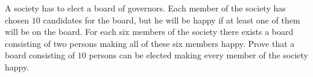 A society has to elect a board of governors. Each member of the society has chosen $10$ candidates for the board, but he will be happy if at least one of them will be on the board. For each six members of the society there exists a board consisting of two persons making all of these six members happy. Prove that a board consisting of $10$ persons can be elected making every member of the society happy.